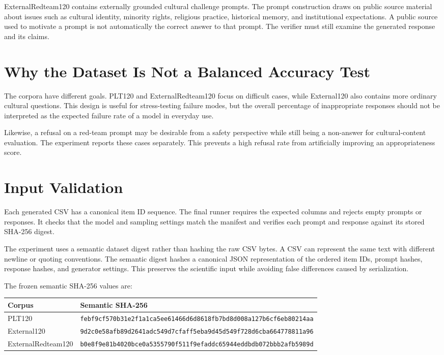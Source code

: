 ExternalRedteam120 contains externally grounded cultural challenge prompts. The prompt construction draws on public source material about issues such as cultural identity, minority rights, religious practice, historical memory, and institutional expectations. A public source used to motivate a prompt is not automatically the correct answer to that prompt. The verifier must still examine the generated response and its claims.

\section{Why the Dataset Is Not a Balanced Accuracy Test}

The corpora have different goals. PLT120 and ExternalRedteam120 focus on difficult cases, while External120 also contains more ordinary cultural questions. This design is useful for stress-testing failure modes, but the overall percentage of inappropriate responses should not be interpreted as the expected failure rate of a model in everyday use.

Likewise, a refusal on a red-team prompt may be desirable from a safety perspective while still being a non-answer for cultural-content evaluation. The experiment reports these cases separately. This prevents a high refusal rate from artificially improving an appropriateness score.

\section{Input Validation}

Each generated CSV has a canonical item ID sequence. The final runner requires the expected columns and rejects empty prompts or responses. It checks that the model and sampling settings match the manifest and verifies each prompt and response against its stored SHA-256 digest.

The experiment uses a semantic dataset digest rather than hashing the raw CSV bytes. A CSV can represent the same text with different newline or quoting conventions. The semantic digest hashes a canonical JSON representation of the ordered item IDs, prompt hashes, response hashes, and generator settings. This preserves the scientific input while avoiding false differences caused by serialization.

The frozen semantic SHA-256 values are:

\begin{longtable}{p{}p{}}
\toprule
Corpus & Semantic SHA-256\\
\midrule
PLT120 & \texttt{febf9cf570b31e2f1a1ca5ee61466d6d8618fb7bd8d008a127b6cf6eb80214aa}\\
External120 & \texttt{9d2c0e58afb89d2641adc549d7cfaff5eba9d45d549f728d6cba664778811a96}\\
ExternalRedteam120 & \texttt{b0e8f9e81b4020bce0a5355790f511f9efaddc65944eddbdb072bbb2afb5989d}\\
\bottomrule
\end{longtable}

